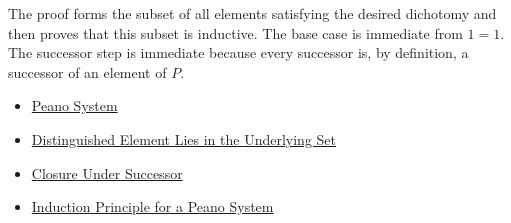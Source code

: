 \begin{remark*}
The proof forms the subset of all elements satisfying the desired dichotomy
and then proves that this subset is inductive. The base case is immediate
from $1=1$. The successor step is immediate because every successor is, by
definition, a successor of an element of $P$.
\end{remark*}

\begin{dependencies}
\begin{itemize}
  \item \hyperref[def:peano-system]{Peano System}
  \item \hyperref[ax:peano-base-in-set]{Distinguished Element Lies in the Underlying Set}
  \item \hyperref[ax:peano-successor-closure]{Closure Under Successor}
  \item \hyperref[thm:induction-principle-for-peano-system]{Induction Principle for a Peano System}
\end{itemize}
\end{dependencies}


\clearpage

